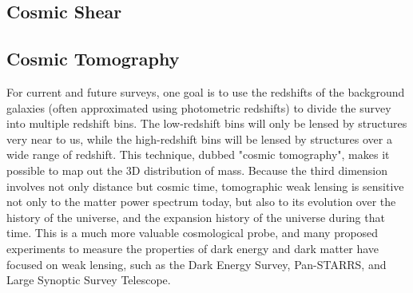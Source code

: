 \subsection{Cosmic Shear}

\subsection{Cosmic Tomography}
For current and future surveys, one goal is to use the redshifts of the background galaxies (often approximated using photometric redshifts) to divide the survey into multiple redshift bins. The low-redshift bins will only be lensed by structures very near to us, while the high-redshift bins will be lensed by structures over a wide range of redshift. This technique, dubbed "cosmic tomography", makes it possible to map out the 3D distribution of mass. Because the third dimension involves not only distance but cosmic time, tomographic weak lensing is sensitive not only to the matter power spectrum today, but also to its evolution over the history of the universe, and the expansion history of the universe during that time. This is a much more valuable cosmological probe, and many proposed experiments to measure the properties of dark energy and dark matter have focused on weak lensing, such as the Dark Energy Survey, Pan-STARRS, and Large Synoptic Survey Telescope.
\cite{lensingbook} \cite{rachel_2018} \cite{hoekstra}
